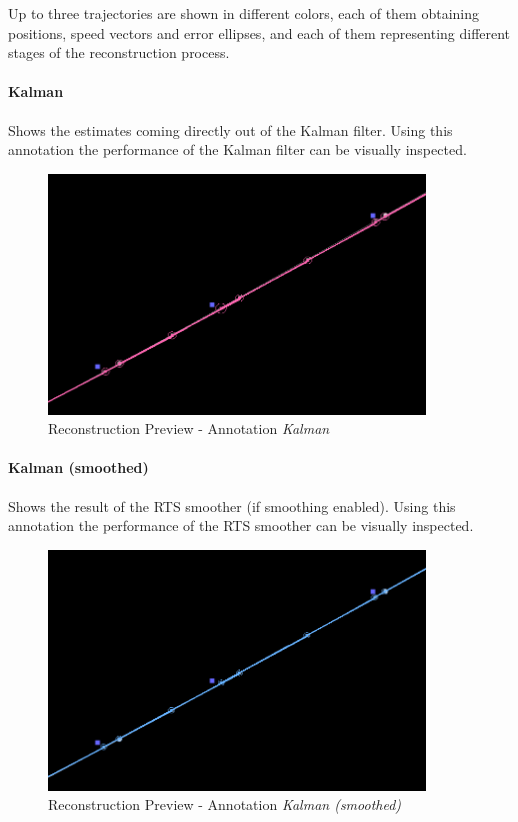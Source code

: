 Up to three trajectories are shown in different colors, each of them obtaining positions, speed vectors and error ellipses,
and each of them representing different stages of the reconstruction process.

\paragraph{Kalman} Shows the estimates coming directly out of the Kalman filter.
Using this annotation the performance of the Kalman filter can be visually inspected.

\begin{figure}[H]
    \center
      \includegraphics[width=10cm]{figures/ui_task_references_recprev_kalman.png}
    \caption{Reconstruction Preview - Annotation \textit{Kalman}} 
\end{figure}

\paragraph{Kalman (smoothed)} Shows the result of the RTS smoother (if smoothing enabled).
Using this annotation the performance of the RTS smoother can be visually inspected.

\begin{figure}[H]
    \center
      \includegraphics[width=10cm]{figures/ui_task_references_recprev_smoothed.png}
    \caption{Reconstruction Preview - Annotation \textit{Kalman (smoothed)}} 
\end{figure}

